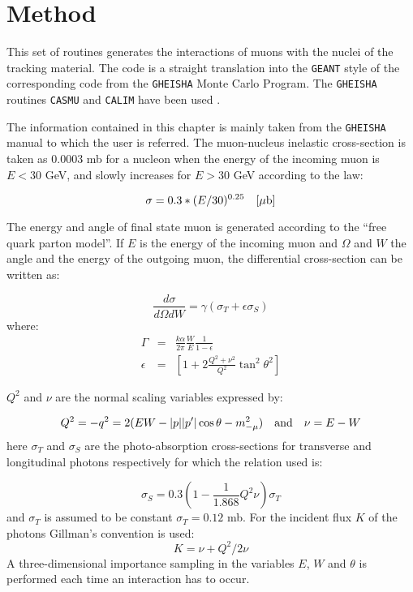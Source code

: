 \section{Method}
This set of routines generates the interactions of muons with the nuclei of
the tracking material. The code is a straight translation into the {\tt GEANT} 
style
of the corresponding code from the {\tt GHEISHA} Monte Carlo Program.
The {\tt GHEISHA} routines {\tt CASMU} and {\tt CALIM} have been used 
\cite{bib-GHEI}.
 
The information contained in this chapter is mainly taken from the {\tt GHEISHA}
manual to which the user is referred.
The muon-nucleus inelastic cross-section is taken as 0.0003 mb for
a nucleon when the energy of the incoming muon is $E<30$ GeV, and slowly
increases for $E>30$ GeV according to the law:
\begin{center}
\[
\sigma = 0.3 * (E/30)^{0.25}\quad [\mu \rm b]
\]
\end{center}
The energy and angle of final state muon is generated according to the ``free
quark parton model''. If $E$ is the energy of the incoming muon and
$\Omega$ and $W$ the
angle and the energy of the outgoing muon, the differential cross-section
can be written as:
 
\[
\frac{d \sigma}{d \Omega dW} =\gamma ( \sigma_T + \epsilon \sigma_S)
\]
where:
\begin{eqnarray*}
\Gamma   & = & \frac{k \alpha}{2 \pi}\frac{W}{E}\frac{1}{1- \epsilon } \\
\epsilon & = & \left [ 1+2 \frac{Q^2 + \nu^2}{Q^2}\tan^2 \theta^2 \right]
\end{eqnarray*}
 
$Q^2$ and $\nu$ are the normal scaling variables expressed by:
 
\[
Q^2 = -q^2 = 2(EW-|p||p'|\cos\theta-m^2_{-\mu})\mbox{\quad and\quad} \nu
= E-W 
\]
 here $\sigma_T$ and $\sigma_S$ are the photo-absorption
cross-sections for transverse and
longitudinal photons respectively for which the relation used is:
 
\[
\sigma_S = 0.3 \left ( 1- \frac{1}{1.868}{Q^2}{\nu}\right)  \sigma_T
\]
and $\sigma_T$ is assumed to be constant $\sigma_T = 0.12 $ mb.
For the incident flux $K$ of
the photons Gillman's convention is used:
\[
K = \nu + Q^2/2\nu
\]
 A three-dimensional importance sampling in the variables $E$, $W$ and
$\theta$ is performed each time an interaction has to occur.
 
